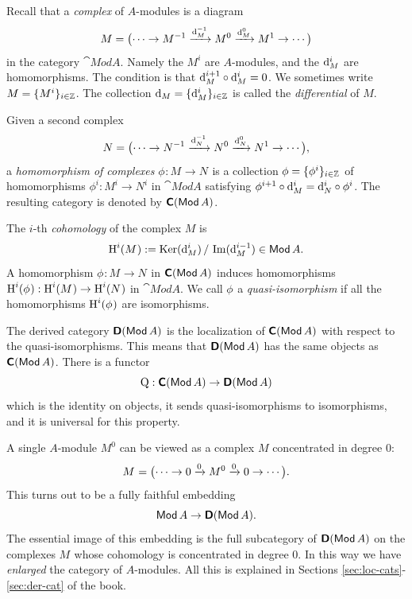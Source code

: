 Recall that a {\em complex} of $A$-modules is a diagram
\begin{equation} \label{eqn:1010}
M = \bigl(  \cdots \to M^{-1} \xrightarrow{\mathrm{d}_M^{-1}} M^{0} 
\xrightarrow{\mathrm{d}_M^0} M^{1} \to \cdots \bigr) 
\end{equation}
in the category $\cat{Mod} A$.
Namely the $M^i$ are $A$-modules, and the $\mathrm{d}_M^{i}$ are homomorphisms.
The condition is that $\mathrm{d}_M^{i + 1} \circ \mathrm{d}_M^{i} = 0$.
We sometimes write 
$M = \{ M^i \}_{i \in \mathbb{Z}}$. 
The collection $\mathrm{d}_M = \{ \mathrm{d}_M^{i} \}_{i \in \mathbb{Z}}$ is called the 
{\em differential} of $M$.

Given a second complex 
\[ N = \bigl(  \cdots \to N^{-1} \xrightarrow{\mathrm{d}_N^{-1}} N^{0} 
\xrightarrow{\mathrm{d}_N^0} N^{1} \to \cdots \bigr) , \]
a {\em homomorphism of complexes} 
$\phi^{} : M^{} \to N^{}$
is a collection 
$\phi = \{ \phi^{i} \}_{i \in \mathbb{Z}}$ 
of homomorphisms 
$\phi^i : M^i \to N^i$ 
in $\cat{Mod} A$ satisfying 
$\phi^{i + 1} \circ \mathrm{d}_M^{i} =  \mathrm{d}_N^{i} \circ \phi^i$.
The resulting category is denoted by $\boldsymbol{\mathsf{C}}(\operatorname{\mathsf{Mod}} A)$. 

The $i$-th {\em cohomology} of the complex $M$ is 
\begin{equation} \label{eqn:5000}
\operatorname{H}^i(M^{}) := 
\operatorname{Ker}(\mathrm{d}_M^{i}) \, / \, \operatorname{Im}(\mathrm{d}_M^{i - 1}) \in \operatorname{\mathsf{Mod}} A . 
\end{equation}
A homomorphism  $\phi^{} : M^{} \to N^{}$
in $\boldsymbol{\mathsf{C}}(\operatorname{\mathsf{Mod}} A)$ induces homomorphisms 
$\operatorname{H}^i(\phi^{}) : \operatorname{H}^i(M^{}) \to \operatorname{H}^i(N^{})$ 
in $\cat{Mod} A$. We call $\phi^{}$ a {\em quasi-isomorphism} if all the 
homomorphisms $\operatorname{H}^i(\phi^{})$ are isomorphisms. 

The derived category $\boldsymbol{\mathsf{D}}(\operatorname{\mathsf{Mod}} A)$ is the localization of 
$\boldsymbol{\mathsf{C}}(\operatorname{\mathsf{Mod}} A)$ with respect to the quasi-isomorphisms. 
This means that $\boldsymbol{\mathsf{D}}(\operatorname{\mathsf{Mod}} A)$ has the same objects as 
$\boldsymbol{\mathsf{C}}(\operatorname{\mathsf{Mod}} A)$. There is a functor 
\begin{equation} \label{eqn:5001}
\operatorname{Q} : \boldsymbol{\mathsf{C}}(\operatorname{\mathsf{Mod}} A) \to \boldsymbol{\mathsf{D}}(\operatorname{\mathsf{Mod}} A)
\end{equation}
which is the identity on objects, it sends quasi-isomorphisms to 
isomorphisms, and it is universal for this property. 

A single $A$-module $M^0$ can be viewed as a complex $M$ concentrated in degree 
$0$:
\[ M^{} = \bigl(  \cdots \to 0 \xrightarrow{0} M^0 \xrightarrow{0} 0 \to \cdots \bigr) . \]
This turns out to be a fully faithful embedding 
\begin{equation} \label{eqn:1004}
\operatorname{\mathsf{Mod}} A \to \boldsymbol{\mathsf{D}}(\operatorname{\mathsf{Mod}} A) .
\end{equation}
The essential image of this embedding is the full subcategory 
of $\boldsymbol{\mathsf{D}}(\operatorname{\mathsf{Mod}} A)$ on the complexes $M^{}$ whose cohomology is 
concentrated in degree $0$. In this way we have {\em enlarged} the category of 
$A$-modules. All this is explained in Sections 
\ref{sec:loc-cats}-\ref{sec:der-cat} of the book. 

